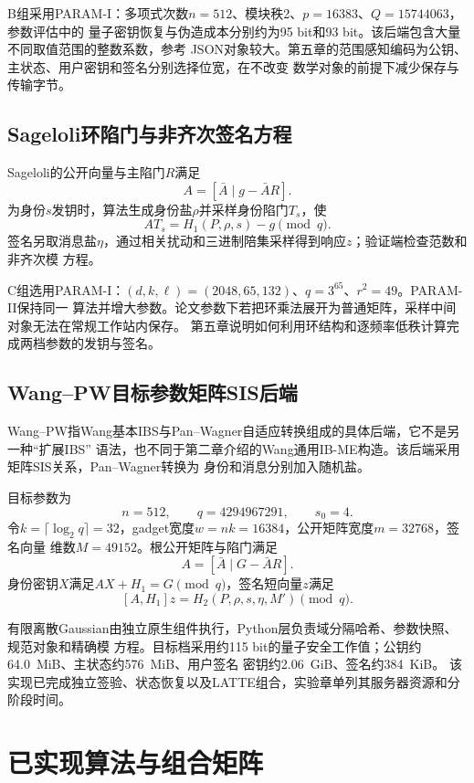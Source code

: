 B组采用PARAM-I：多项式次数$n=512$、模块秩2、$p=16383$、$Q=15744063$，参数评估中的
量子密钥恢复与伪造成本分别约为95 bit和93 bit。该后端包含大量不同取值范围的整数系数，参考
JSON对象较大。第五章的范围感知编码为公钥、主状态、用户密钥和签名分别选择位宽，在不改变
数学对象的前提下减少保存与传输字节。

\subsection{Sageloli环陷门与非齐次签名方程}

Sageloli的公开向量与主陷门$R$满足
\[
 A=[\bar A\mid g-\bar AR].
\]
为身份$s$发钥时，算法生成身份盐$\rho$并采样身份陷门$T_s$，使
\[
 AT_s=H_1(P,\rho,s)-g\pmod q.
\]
签名另取消息盐$\eta$，通过相关扰动和三进制陪集采样得到响应$z$；验证端检查范数和非齐次模
方程\cite{sageloli2023ibs}。

C组选用PARAM-I：$(d,k,\ell)=(2048,65,132)$、$q=3^{65}$、$r^2=49$。PARAM-II保持同一
算法并增大参数。论文参数下若把环乘法展开为普通矩阵，采样中间对象无法在常规工作站内保存。
第五章说明如何利用环结构和逐频率低秩计算完成两档参数的发钥与签名。

\subsection{Wang--PW目标参数矩阵SIS后端}

Wang--PW指Wang基本IBS与Pan--Wagner自适应转换组成的具体后端，它不是另一种“扩展IBS”
语法，也不同于第二章介绍的Wang通用IB-ME构造。该后端采用矩阵SIS关系，Pan--Wagner转换为
身份和消息分别加入随机盐\cite{wang2024ibme,pan2021ibs}。

目标参数为
\[
 n=512,\qquad q=4294967291,\qquad s_0=4.
\]
令$k=\lceil\log_2q\rceil=32$，gadget宽度$w=nk=16384$，公开矩阵宽度$m=32768$，签名向量
维数$M=49152$。根公开矩阵与陷门满足
\[
 A=[\bar A\mid G-\bar AR].
\]
身份密钥$X$满足$AX+H_1=G\pmod q$，签名短向量$z$满足
\[
 [A,H_1]z=H_2(P,\rho,s,\eta,M')\pmod q.
\]

有限离散Gaussian由独立原生组件执行，Python层负责域分隔哈希、参数快照、规范对象和精确模
方程。目标档采用约115 bit的量子安全工作值；公钥约64.0~MiB、主状态约576~MiB、用户签名
密钥约2.06~GiB、签名约384~KiB。
该实现已完成独立签验、状态恢复以及LATTE组合，实验章单列其服务器资源和分阶段时间。

\section{已实现算法与组合矩阵}


